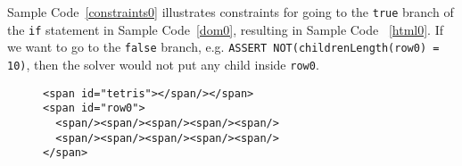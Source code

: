 Sample Code~\ref{constraints0} illustrates constraints for going to the {\tt true} branch of the {\tt if} statement in Sample Code~\ref{dom0}, resulting in Sample Code ~\ref{html0}.  
If we want to go to the {\tt false} branch, e.g. {\tt ASSERT NOT(childrenLength(row0) = 10)}, then the solver would not put any child inside {\tt row0}.  

\begin{figure}
\begin{lstlisting}[caption=Example HTML generated by the DOM solver based on the constraints defined in Sample Code ~\ref{constraints0}.  Note that {\tt row0} is not a child of {\tt tetris} because the source code in Sample Code \ref{dom0} did not require the rows to be children of {\tt tetris}.,label=html0]  
<span id="tetris"></span/></span>
<span id="row0">
  <span/><span/><span/><span/><span/>
  <span/><span/><span/><span/><span/>
</span>
\end{lstlisting}
\end{figure}
